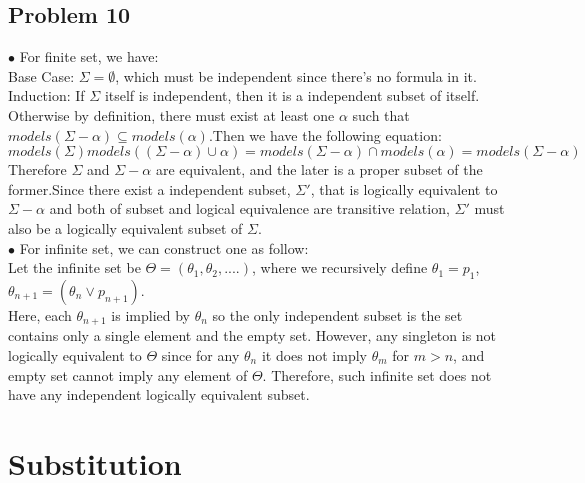 \documentclass[12pt]{article}
\begin{document}
\subsection*{Problem 10}
$\bullet$ For finite set, we have:\\[5pt]
Base Case: $\Sigma = \emptyset$, which must be independent since there's no formula in it.\\[5pt]
Induction: 
If $\Sigma$ itself is independent, then it is a independent subset of itself.\\[3pt]
Otherwise by definition, there must exist at least one $\alpha$ such that $models(\Sigma - \alpha) \subseteq models(\alpha)$.Then we have the following equation: 
\begin{equation*}
    models(\Sigma) models((\Sigma - \alpha) \cup \alpha) = models(\Sigma - \alpha) \cap models(\alpha) = models(\Sigma - \alpha)
\end{equation*}
Therefore $\Sigma$ and $\Sigma - \alpha$ are equivalent, and the later is a proper subset of the former.Since there exist a independent subset, $\Sigma'$, that is logically equivalent to $\Sigma - \alpha$ and both of subset and logical equivalence are transitive relation, $\Sigma'$ must also be a logically equivalent subset of $\Sigma$.\\[10pt]
$\bullet$ For infinite set, we can construct one as follow:\\[5pt]
Let the infinite set be $\Theta = (\theta_1, \theta_2, ....)$, where we recursively define $\theta_1 = p_1$, $\theta_{n+1} = (\theta_{n} \vee p_{n+1})$.\\[3pt]
Here, each $\theta_{n+1}$ is implied by $\theta_n$ so the only independent subset is the set contains only a single element and the empty set. However, any singleton is not logically equivalent to $\Theta$ since for any $\theta_{n}$ it does not imply $\theta_m$ for $m>n$, and empty set cannot imply any element of $\Theta$. Therefore, such infinite set does not have any independent logically equivalent subset. 

\newpage

\section*{Substitution}
\end{document}
